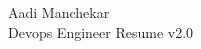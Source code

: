 \documentclass{article}
\begin{document}
\begin{center}
    \Huge Aadi Manchekar \\
    \Large Devops Engineer Resume v2.0
\end{center}
\end{document}
